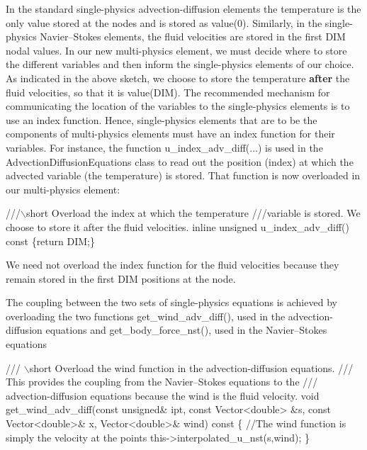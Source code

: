 In the standard single-\/physics advection-\/diffusion elements the temperature is the only value stored at the nodes and is stored as {\ttfamily value(0)}. Similarly, in the single-\/physics Navier--Stokes elements, the fluid velocities are stored in the first {\ttfamily D\+IM} nodal values. In our new multi-\/physics element, we must decide where to store the different variables and then inform the single-\/physics elements of our choice. As indicated in the above sketch, we choose to store the temperature {\bfseries after} the fluid velocities, so that it is {\ttfamily value(\+D\+I\+M)}. The recommended mechanism for communicating the location of the variables to the single-\/physics elements is to use an index function. Hence, single-\/physics elements that are to be the components of multi-\/physics elements must have an index function for their variables. For instance, the function {\ttfamily u\+\_\+index\+\_\+adv\+\_\+diff}(...) is used in the {\ttfamily Advection\+Diffusion\+Equations} class to read out the position (index) at which the advected variable (the temperature) is stored. That function is now overloaded in our multi-\/physics element\+:

 
\begin{DoxyCodeInclude}
 \textcolor{comment}{///\(\backslash\)short Overload the index at which the temperature }
\textcolor{comment}{ ///variable is stored. We choose to store it after the fluid velocities.}
\textcolor{comment}{} \textcolor{keyword}{inline} \textcolor{keywordtype}{unsigned} u\_index\_adv\_diff()\textcolor{keyword}{ const }\{\textcolor{keywordflow}{return} DIM;\}

\end{DoxyCodeInclude}


We need not overload the index function for the fluid velocities because they remain stored in the first {\ttfamily D\+IM} positions at the node.

The coupling between the two sets of single-\/physics equations is achieved by overloading the two functions {\ttfamily get\+\_\+wind\+\_\+adv\+\_\+diff()}, used in the advection-\/diffusion equations and {\ttfamily get\+\_\+body\+\_\+force\+\_\+nst()}, used in the Navier--Stokes equations

 
\begin{DoxyCodeInclude}
 \textcolor{comment}{/// \(\backslash\)short Overload the wind function in the advection-diffusion equations.}
\textcolor{comment}{ /// This provides the coupling from the Navier--Stokes equations to the}
\textcolor{comment}{}\textcolor{comment}{ /// advection-diffusion equations because the wind is the fluid velocity.}
\textcolor{comment}{} \textcolor{keywordtype}{void} get\_wind\_adv\_diff(\textcolor{keyword}{const} \textcolor{keywordtype}{unsigned}& ipt,
                        \textcolor{keyword}{const} Vector<double> &s, \textcolor{keyword}{const} Vector<double>& x,
                        Vector<double>& wind)\textcolor{keyword}{ const}
\textcolor{keyword}{ }\{
   \textcolor{comment}{//The wind function is simply the velocity at the points}
   this->interpolated\_u\_nst(s,wind);
 \}

\end{DoxyCodeInclude}


